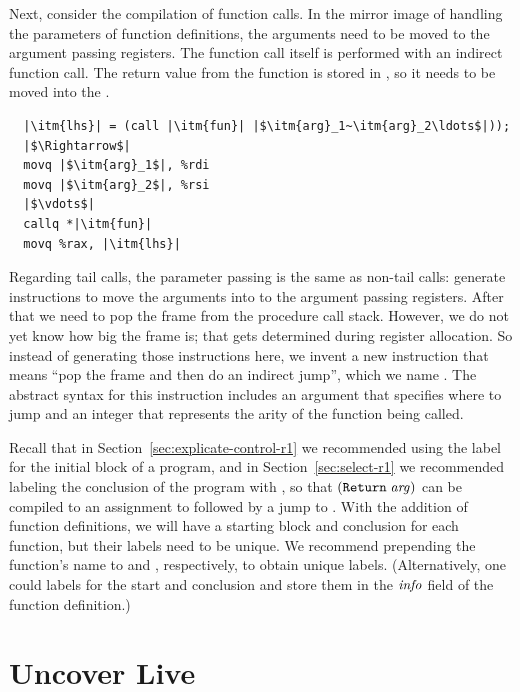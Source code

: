 \documentclass[11pt]{book}
\begin{document}
Next, consider the compilation of function calls. In the mirror image
of handling the parameters of function definitions, the arguments need
to be moved to the argument passing registers.  The function call
itself is performed with an indirect function call. The return value
from the function is stored in , so it needs to be moved
into the .
\begin{lstlisting}
  |\itm{lhs}| = (call |\itm{fun}| |$\itm{arg}_1~\itm{arg}_2\ldots$|));
  |$\Rightarrow$|
  movq |$\itm{arg}_1$|, %rdi
  movq |$\itm{arg}_2$|, %rsi
  |$\vdots$|
  callq *|\itm{fun}|
  movq %rax, |\itm{lhs}|
\end{lstlisting}

Regarding tail calls, the parameter passing is the same as non-tail
calls: generate instructions to move the arguments into to the
argument passing registers.  After that we need to pop the frame from
the procedure call stack.  However, we do not yet know how big the
frame is; that gets determined during register allocation. So instead
of generating those instructions here, we invent a new instruction
that means ``pop the frame and then do an indirect jump'', which we
name . The abstract syntax for this instruction includes
an argument that specifies where to jump and an integer that
represents the arity of the function being called.

Recall that in Section~\ref{sec:explicate-control-r1} we recommended
using the label  for the initial block of a program, and
in Section~\ref{sec:select-r1} we recommended labeling the conclusion
of the program with , so that $(\texttt{Return}\;\mathit{arg})$
can be compiled to an assignment to  followed by a jump to
. With the addition of function definitions, we will
have a starting block and conclusion for each function, but their
labels need to be unique. We recommend prepending the function's name
to  and , respectively, to obtain unique
labels. (Alternatively, one could  labels for the start
and conclusion and store them in the $\mathit{info}$ field of the
function definition.)


\section{Uncover Live}

\end{document}
